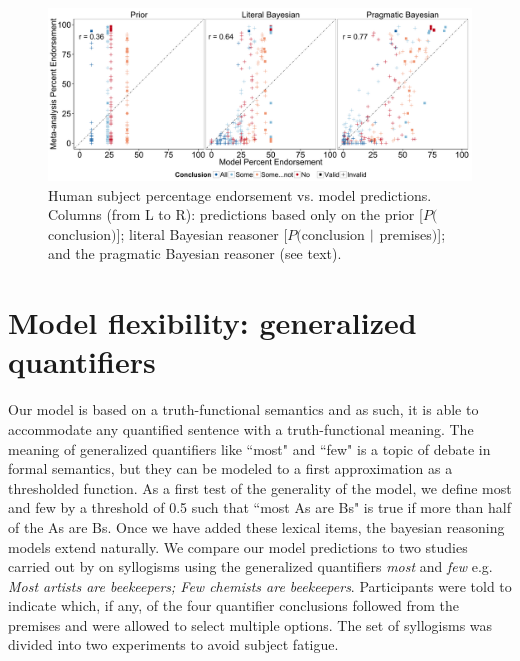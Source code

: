 \documentclass[10pt,letterpaper]{article}
\begin{document}
\begin{figure}[t!] %
\centering
	\subfigure
		\centering
  \includegraphics[width=\textwidth]{multiScatter_fig2}
  \caption{Human subject percentage endorsement vs. model predictions.
  Columns (from L to R): predictions based only on the prior [$P($conclusion$)$]; literal Bayesian reasoner [$P($conclusion $\arrowvert$ premises$)$]; and the pragmatic Bayesian reasoner (see text).}
  \label{fig:megaScatter}

\end{figure}






\section{Model flexibility: generalized quantifiers}

Our model is based on a truth-functional semantics and as such, it is able to accommodate any quantified sentence with a truth-functional meaning. The meaning of generalized quantifiers like ``most" and ``few" is a topic of debate in formal semantics, but they can be modeled to a first approximation as a thresholded function. As a first test of the generality of the model, we define most and few by a threshold of 0.5 such that ``most As are Bs" is true if more than half of the As are Bs. Once we have added these lexical items, the bayesian reasoning models extend naturally. 
%
We compare our model predictions to two studies carried out by  on syllogisms using the generalized quantifiers \emph{most} and \emph{few} e.g. \emph{Most artists are beekeepers; Few chemists are beekeepers}. Participants were told to indicate which, if any, of the four quantifier conclusions followed from the premises and were allowed to select multiple options.
%
The set of syllogisms was divided into two experiments to avoid subject fatigue.
\end{document}
